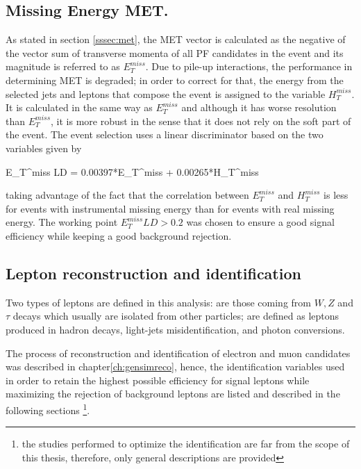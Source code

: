 



\subsection{Missing Energy MET.}

As stated in section \ref{sssec:met}, the MET vector is calculated as the negative of the vector sum of transverse momenta of all PF candidates in the event and its magnitude is referred to as $E_T^{miss}$. Due to pile-up interactions, the performance in determining MET is degraded; in order to correct for that, the energy from the selected jets and leptons that compose the event is assigned to the variable $H_T^{miss}$. It is calculated in the same way as  $E_T^{miss}$ and although it has worse resolution than $E_T^{miss}$, it is more robust in the sense that it does not rely on the soft part of the event. The event selection uses a linear discriminator based on the two variables given by 

\beqn
E_T^{miss} LD = 0.00397*E_T^{miss} + 0.00265*H_T^{miss}
\eeqn

\noindent taking advantage of the fact that the correlation between $E_T^{miss}$ and  $H_T^{miss}$ is less for events with instrumental missing energy than for events with real missing energy. The working point $E_T^{miss} LD > 0.2$ was chosen to ensure a good signal efficiency while keeping a good background rejection.

\subsection{Lepton reconstruction and identification}

Two types of leptons are defined in this analysis:  are those coming from $W, Z$ and $\tau$ decays which usually are isolated from other particles;  are defined as leptons produced in \bjet hadron decays, light-jets misidentification, and photon conversions. 

The process of reconstruction and identification of electron and muon candidates was described in chapter\ref{ch:gensimreco}, hence, the identification variables used in order to retain the highest possible efficiency for signal leptons while maximizing the rejection of background leptons are listed and described in the following sections \footnote{the studies performed to optimize the identification are far from the scope of this thesis, therefore, only general descriptions are provided}.

